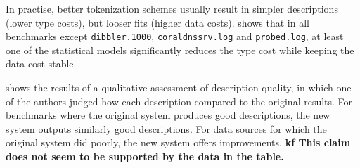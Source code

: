 In practise, better tokenization schemes usually result in simpler
descriptions (lower type costs), but looser fits (higher data costs).
shows that in all benchmarks except {\tt dibbler.1000}, {\tt coraldnssrv.log} and
{\tt probed.log}, at least one of the statistical models significantly
reduces the type cost while keeping the data cost stable. 

 shows the results of a qualitative assessment of
description quality, in which one of the authors judged how each
description compared to the original \learnpads{} results.
For benchmarks where the original system produces good descriptions, 
the new system outputs similarly good descriptions. For 
data sources for which the original system did poorly,
the new system offers improvements.
{\bf kf This claim does not seem to be supported by the data in the
  table. }

